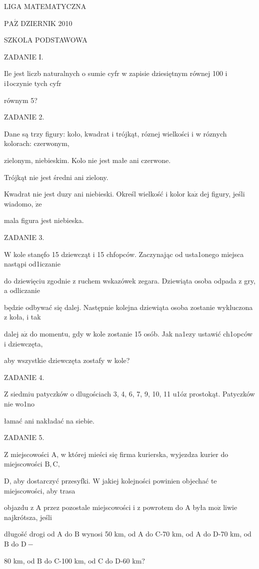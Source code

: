 \documentclass[a4paper,12pt]{article}
\begin{document}
LIGA MATEMATYCZNA

$\mathrm{P}\mathrm{A}\acute{\mathrm{Z}}$ DZIERNIK 2010

SZKOLA PODSTAWOWA

ZADANIE I.

Ile jest liczb naturalnych o sumie cyfr w zapisie dziesiętnym równej 100 i i1oczynie tych cyfr

równym 5?

ZADANIE 2.

Dane są trzy figury: koło, kwadrat i trójkąt, róznej wielkości i w róznych kolorach: czerwonym,

zielonym, niebieskim. Kolo nie jest małe ani czerwone.

Trójkąt nie jest średni ani zielony.

Kwadrat nie jest duzy ani niebieski. Określ wielkość i kolor $\mathrm{k}\mathrm{a}\dot{\mathrm{z}}$ dej figury, jeśli wiadomo, $\dot{\mathrm{z}}\mathrm{e}$

mala figura jest niebieska.

ZADANIE 3.

$\mathrm{W}$ kole stanęfo 15 dziewcząt i 15 chfopców. Zaczynając od usta1onego miejsca nastąpi od1iczanie

do dziewięciu zgodnie z ruchem wskazówek zegara. Dziewiąta osoba odpada z gry, a odliczanie

będzie odbywać się dalej. Następnie kolejna dziewiąta osoba zostanie wykluczona z koła, i tak

dalej $\mathrm{a}\dot{\mathrm{z}}$ do momentu, gdy w kole zostanie 15 osób. Jak na1ezy ustawić ch1opców i dziewczęta,

aby wszystkie dziewczęta zostafy w kole?

ZADANIE 4.

Z siedmiu patyczków o dlugościach 3, 4, 6, 7, 9, 10, 11 u1óz prostokąt. Patyczków nie wo1no

łamać ani nakładać na siebie.

ZADANIE 5.

$\mathrm{Z}$ miejscowości $\mathrm{A}$, w której mieści się firma kurierska, wyjezdza kurier do miejscowości $\mathrm{B}, \mathrm{C},$

$\mathrm{D}$, aby dostarczyć przesyfki. $\mathrm{W}$ jakiej kolejności powinien objechać te miejscowości, aby trasa

objazdu z A przez pozostale miejscowości i z powrotem do A była $\mathrm{m}\mathrm{o}\dot{\mathrm{z}}$ liwie najkrótsza, jeśli

długošć drogi od A do $\mathrm{B}$ wynosi 50 km, od A do C-70 km, od A do D-70 km, od $\mathrm{B}$ do $\mathrm{D}-$

$80$ km, od $\mathrm{B}$ do C-100 km, od $\mathrm{C}$ do D-60 km?
\end{document}
